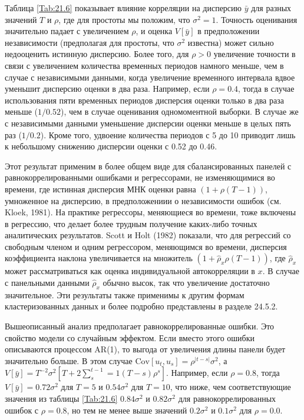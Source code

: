 Таблица \ref{Tab:21.6} показывает влияние корреляции на дисперсию $\bar{y}$ для разных значений $T$ и $\rho$, где для простоты мы положим, что $\sigma^2=1$. Точность оценивания значительно падает с увеличением $\rho$, и оценка $V[\bar{y}]$ в предположении независимости (предполагая для простоты, что $\sigma^2$ известна) может сильно недооценить истинную дисперсию. Более того, для $\rho > 0$ увеличение точности в связи с увеличением количества временных периодов намного меньше, чем в случае с независимыми данными, когда увеличение временного интервала вдвое уменьшит дисперсию оценки в два раза. Например, если $\rho=0.4$, тогда в случае использования пяти временных периодов дисперсия оценки только в два раза меньше ($1/0.52$), чем в случае оценивания одномоментной выборки. В случае же с независимыми данными уменьшение дисперсии оценки меньше в целых пять раз ($1/0.2$). Кроме того, удвоение количества периодов с 5 до 10 приводит лишь к небольшому снижению дисперсии оценки с 0.52 до 0.46.

Этот результат применим в более общем виде для сбалансированных панелей с равнокоррелированными ошибками и регрессорами, не изменяющимися во времени, где истинная дисперсия МНК оценки равна $(1+\rho(T-1))$, умноженное на дисперсию, в предположениии о независимости ошибок (см. Kloek, 1981). На практике регрессоры, меняющиеся во времени, тоже включены в регрессию, что делает более трудным получение каких-либо точных аналитических результатов. Scott и Holt (1982) показали, что для регрессий со свободным членом и одним регрессором, меняющимся во времени, дисперсия коэффициента наклона увеличивается на множитель $(1+\hat{\rho}_x\rho(T-1))$, где $\hat{\rho}_x$ может рассматриваться как оценка индивидуальной автокорреляции в $x$. В случае с панельными данными  $\hat{\rho}_x$ обычно высок, так что увеличение достаточно значительное. Эти результаты также применимы к другим формам кластеризованных  данных и более подробно представлены в разделе 24.5.2.

Вышеописанный анализ предполагает равнокоррелированные ошибки. Это свойство модели со случайным эффектом. Если вместо этого ошибки описываются процессом AR(1), то выгода от увеличения длины панели будет значительно больше. В этом случае $\mathrm{Cov}[u_{t}, u_{s}]=\rho^{|t-s|}\sigma^2$, а $V[\bar{y}]=T^{-2}\sigma^2[T+2\sum^{t-1}_s=1(T-s)\rho^s]$. Например, если $\rho=0.8$, тогда $V[\bar{y}]=0.72\sigma^2$ для $T=5$ и $0.54\sigma^2$ для $T=10$, что ниже, чем соответствующие значения из таблицы \ref{Tab:21.6} $0.84\sigma^2$ и $0.82\sigma^2$ для равнокоррелированных ошибок с $\rho=0.8$, но тем не менее выше значений $0.2\sigma^2$ и $0.1\sigma^2$ для $\rho=0.0$.

